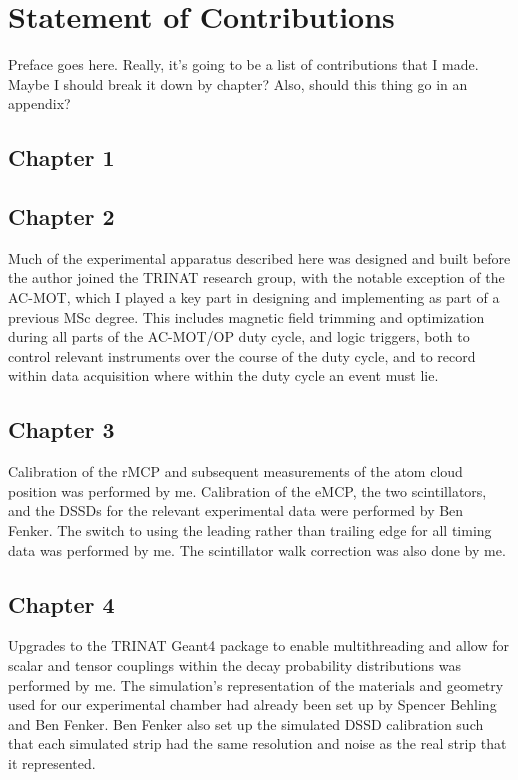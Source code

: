 

\clearpage
\chapter{Statement of Contributions}
\label{ch:contributions}


Preface goes here.  Really, it's going to be a list of contributions that I made.  Maybe I should break it down by chapter?  Also, should this thing go in an appendix?

\section{Chapter 1}
\section{Chapter 2}
Much of the experimental apparatus described here was designed and built before the author joined the TRINAT research group, with the notable exception of the AC-MOT, which I played a key part in designing and implementing as part of a previous MSc degree.  This includes magnetic field trimming and optimization during all parts of the AC-MOT/OP duty cycle, and logic triggers, both to control relevant instruments over the course of the duty cycle, and to record within data acquisition where within the duty cycle an event must lie.  
\section{Chapter 3}
Calibration of the rMCP and subsequent measurements of the atom cloud position was performed by me.  Calibration of the eMCP, the two scintillators, and the DSSDs for the relevant experimental data were performed by Ben Fenker.  The switch to using the leading rather than trailing edge for all timing data was performed by me.  The scintillator walk correction was also done by me.  
\section{Chapter 4}
Upgrades to the TRINAT Geant4 package to enable multithreading and allow for scalar and tensor couplings within the decay probability distributions was performed by me.  The simulation's representation of the materials and geometry used for our experimental chamber had already been set up by Spencer Behling and Ben Fenker.  Ben Fenker also set up the simulated DSSD calibration such that each simulated strip had the same resolution and noise as the real strip that it represented.  

